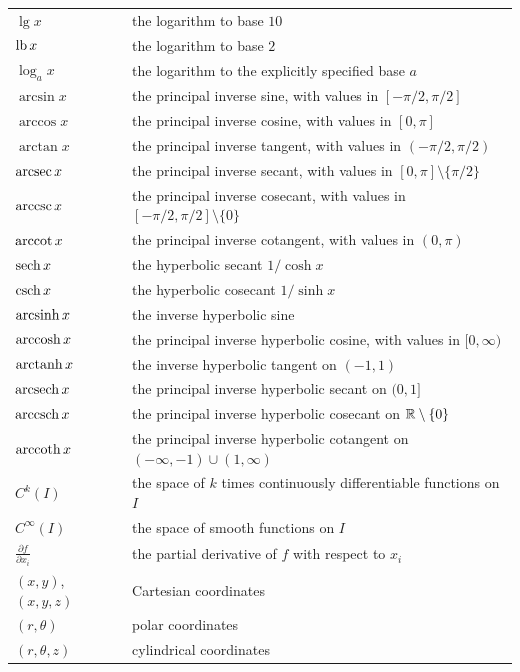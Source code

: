 {\begin{longtable}{@{}L{0.27\textwidth}L{0.65\textwidth}@{}}
        $\lg x$ & the logarithm to base $10$ \\
        $\operatorname{lb} x$ & the logarithm to base $2$ \\
        $\log_a x$ & the logarithm to the explicitly specified base $a$ \\
        $\arcsin x$ & the principal inverse sine, with values in $[-\pi/2,\pi/2]$ \\
        $\arccos x$ & the principal inverse cosine, with values in $[0,\pi]$ \\
        $\arctan x$ & the principal inverse tangent, with values in $(-\pi/2,\pi/2)$ \\
        $\operatorname{arcsec} x$ & the principal inverse secant, with values in $[0,\pi]\setminus\{\pi/2\}$ \\
        $\operatorname{arccsc} x$ & the principal inverse cosecant, with values in $[-\pi/2,\pi/2]\setminus\{0\}$ \\
        $\operatorname{arccot} x$ & the principal inverse cotangent, with values in $(0,\pi)$ \\
        $\operatorname{sech} x$ & the hyperbolic secant $1/\cosh x$ \\
        $\operatorname{csch} x$ & the hyperbolic cosecant $1/\sinh x$ \\
        $\operatorname{arcsinh} x$ & the inverse hyperbolic sine \\
        $\operatorname{arccosh} x$ & the principal inverse hyperbolic cosine, with values in $[0,\infty)$ \\
        $\operatorname{arctanh} x$ & the inverse hyperbolic tangent on $(-1,1)$ \\
        $\operatorname{arcsech} x$ & the principal inverse hyperbolic secant on $(0,1]$ \\
        $\operatorname{arccsch} x$ & the principal inverse hyperbolic cosecant on $\mathbb{R}\setminus\{0\}$ \\
        $\operatorname{arccoth} x$ & the principal inverse hyperbolic cotangent on $(-\infty,-1)\cup(1,\infty)$ \\
        $C^k(I)$ & the space of $k$ times continuously differentiable functions on $I$ \\
        $C^\infty(I)$ & the space of smooth functions on $I$ \\
        $\displaystyle\frac{\partial f}{\partial x_i}$ & the partial derivative of $f$ with respect to $x_i$ \\
        $(x,y)$, $(x,y,z)$ & Cartesian coordinates \\
        $(r,\theta)$ & polar coordinates \\
        $(r,\theta,z)$ & cylindrical coordinates \\

\end{longtable}}
